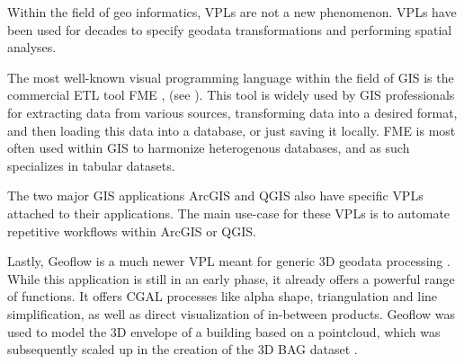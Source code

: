 Within the field of geo informatics, \ac{VPL}s are not a new phenomenon. VPLs have been used for decades to specify geodata transformations and performing spatial analyses.  

The most well-known visual programming language within the field of \ac{GIS} is the commercial \ac{ETL} tool FME \citep{safe-software_fme_2022}, (see ). 
This tool is widely used by \ac{GIS} professionals for extracting data from various sources, transforming data into a desired format, and then loading this data into a database, or just saving it locally.  
FME is most often used within GIS to harmonize heterogenous databases, and as such specializes in tabular datasets. 

The two major GIS applications ArcGIS and QGIS also have specific \ac{VPL}s attached to their applications. 
The main use-case for these \ac{VPL}s is to automate repetitive workflows within ArcGIS or QGIS. 

Lastly, Geoflow is a much newer \ac{VPL} meant for generic 3D geodata processing \citep{peters_geoflow_2019}.
While this application is still in an early phase, it already offers a powerful 
range of functions.
It offers CGAL processes like alpha shape, triangulation and line simplification, as well as direct visualization of in-between products.
Geoflow was used to model the 3D envelope of a building based on a pointcloud, which was subsequently scaled up in the creation of the 3D BAG dataset \citep{peters_geoflow_2019}.


